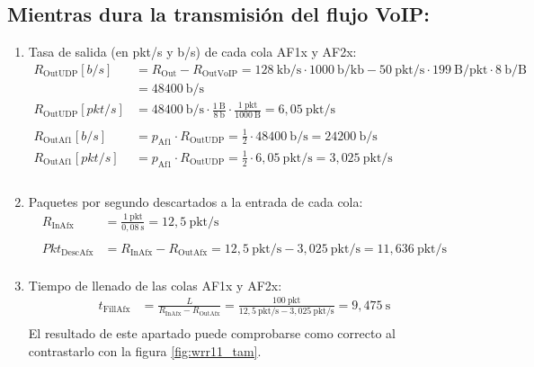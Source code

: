 \subsection{Mientras dura la transmisión del flujo VoIP:}
\begin{enumerate}
    \item Tasa de salida (en pkt/s y b/s) de cada cola AF1x y AF2x: \\
    \[
        \begin{aligned}
            R_{\text{OutUDP}}[b/s] &= R_{\text{Out}} - R_{\text{OutVoIP}} = 128~\text{kb/s} \cdot 1000~\text{b/kb} - 50~\text{pkt/s} \cdot 199~\text{B/pkt} \cdot 8~\text{b/B} \\
                              &= 48400~\text{b/s} \\
            R_{\text{OutUDP}}[pkt/s] &= 48400~\text{b/s} \cdot \frac{1~\text{B}}{8~\text{b}} \cdot \frac{1~\text{pkt}}{1000~\text{B}} = 6,05~\text{pkt/s} \\ \\
            R_{\text{OutAf1}}[b/s] &= p_{\text{Af1}} \cdot R_{\text{OutUDP}} = \frac{1}{2} \cdot 48400~\text{b/s} = 24200~\text{b/s} \\
            R_{\text{OutAf1}}[pkt/s] &= p_{\text{Af1}} \cdot R_{\text{OutUDP}} = \frac{1}{2} \cdot 6,05~\text{pkt/s} = 3,025~\text{pkt/s} \\ \\
        \end{aligned}
    \]
    \item Paquetes por segundo descartados a la entrada de cada cola:
    \[
        \label{eq:udp_paquetes_descartados_con_VoIP}
        \begin{aligned}
            R_{\text{InAfx}} &= \frac{1~\text{pkt}}{0,08~\text{s}} = 12,5~\text{pkt/s} \\ \\
            Pkt_{\text{DescAfx}} &= R_{\text{InAfx}} - R_{\text{OutAfx}} = 12,5~\text{pkt/s} - 3,025~\text{pkt/s} = 11,636~\text{pkt/s} \\
        \end{aligned}
    \]
    \item Tiempo de llenado de las colas AF1x y AF2x:
    \[
        \begin{aligned}
            t_{\text{FillAfx}} &= \frac{L}{R_{\text{InAfx}} - R_{\text{OutAfx}}} = \frac{100~\text{pkt}}{12,5~\text{pkt/s} - 3,025~\text{pkt/s}} = 9,475~\text{s} \\
        \end{aligned}
    \]
    El resultado de este apartado puede comprobarse como correcto al contrastarlo con la figura
    \ref{fig:wrr11_tam}.

\end{enumerate}

